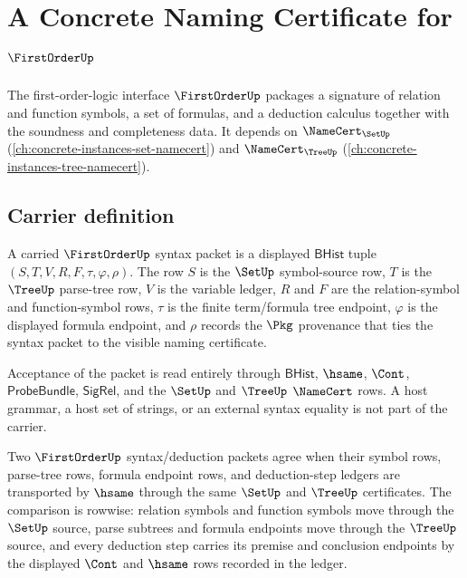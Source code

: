 \chapter{A Concrete Naming Certificate for $\FirstOrderUp$}
\label{ch:concrete-instances-firstorder-namecert}

The first-order-logic interface $\FirstOrderUp$ packages a signature of relation and function symbols, a set of formulas, and a deduction calculus together with the soundness and completeness data. It depends on $\NameCert_{\SetUp}$ (\autoref{ch:concrete-instances-set-namecert}) and $\NameCert_{\TreeUp}$ (\autoref{ch:concrete-instances-tree-namecert}).

\section{Carrier definition}
\label{sec:firstorder-carrier}

\begin{definition}\label{def:firstorder-bhist-syntax-carrier}
A carried $\FirstOrderUp$ syntax packet is a displayed $\mathsf{BHist}$ tuple
$(S,T,V,R,F,\tau,\varphi,\rho)$. The row $S$ is the $\SetUp$ symbol-source
row, $T$ is the $\TreeUp$ parse-tree row, $V$ is the variable ledger, $R$ and
$F$ are the relation-symbol and function-symbol rows, $\tau$ is the finite
term/formula tree endpoint, $\varphi$ is the displayed formula endpoint, and
$\rho$ records the $\Pkg$ provenance that ties the syntax packet to the
visible naming certificate.

Acceptance of the packet is read entirely through $\mathsf{BHist}$, $\hsame$,
$\Cont$, $\mathsf{ProbeBundle}$, $\mathsf{SigRel}$, and the $\SetUp$ and $\TreeUp$
$\NameCert$ rows. A host grammar, a host set of strings, or an external
syntax equality is not part of the carrier.
\end{definition}

\begin{definition}\label{def:firstorder-deduction-ledger-classifier}
Two $\FirstOrderUp$ syntax/deduction packets agree when their symbol rows,
parse-tree rows, formula endpoint rows, and deduction-step ledgers are
transported by $\hsame$ through the same $\SetUp$ and $\TreeUp$ certificates.
The comparison is rowwise: relation symbols and function symbols move through
the $\SetUp$ source, parse subtrees and formula endpoints move through the
$\TreeUp$ source, and every deduction step carries its premise and conclusion
endpoints by the displayed $\Cont$ and $\hsame$ rows recorded in the ledger.
\end{definition}

